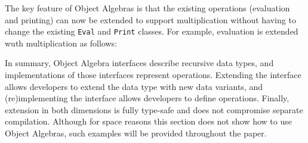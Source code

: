 
\noindent The key feature of Object Algebras is that the existing operations
(evaluation and printing) can now be extended to support
multiplication without having to change the existing \lstinline{Eval}
and \lstinline{Print} classes. For example, evaluation is extended 
wuth multiplication as follows:


In summary, Object Algebra interfaces describe recursive data types,
and implementations of those interfaces represent
operations. Extending the interface allows developers to extend the
data type with new data variants, and (re)implementing the interface
allows developers to define operations.  Finally, extension in both
dimensions is fully type-safe and does not compromise separate
compilation. Although for space reasons this section does not show
how to use Object Algebras, such examples will be provided throughout
the paper.





\begin{comment}

This paper showed how various types of traversals for complex
structures can be automatically provided by \Name. \name traversals are
written directly in Java and are type-safe, extensible and separately
compilable. There has always been a tension between the
correctness guarantees of static typing, and the flexibility of
untyped/dynamically-typed approaches. \name shows that even
in type systems like Java's, it is possible to get considerable
flexibility and adaptability for the problem of boilerplate code in
traversals of complex structures, without giving up modular static typing.

There are many of avenues for future work. One area of research is to
extend \name traversals to support flexible traversal strategies,
similarly to strategic
programming~\cite{borovansky1996elan,visser1998core,vandenBrand:2003:TRT:941566.941568}. Another
line of work worth exploring is to adopt generalizations of object
algebras~\cite{oliveira13fop} for added expressiveness of \name
traversals.

\end{comment}
